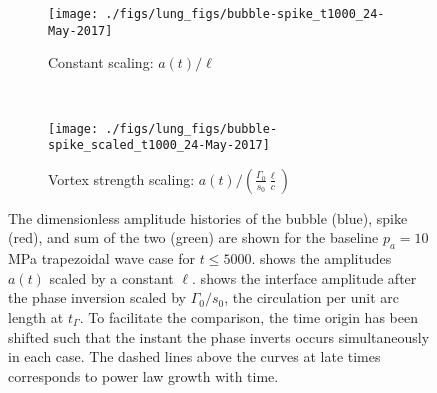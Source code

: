 \documentclass{jfm}%
\begin{document}
\begin{figure}
  \centering
  \begin{subfigure}[t]{0.45\textwidth}
    \centering
    \texttt{[image: ./figs/lung\_figs/bubble-spike\_t1000\_24-May-2017]}
    \caption{\label{fig:trapz_bubble-spike_t1000_unscaled} Constant scaling: $a(t)/\ell$}
  \end{subfigure}
  ~
  \begin{subfigure}[t]{0.45\textwidth}
    \texttt{[image: ./figs/lung\_figs/bubble-spike\_scaled\_t1000\_24-May-2017]}
    \caption{\label{fig:trapz_bubble-spike_t1000_scaled} Vortex strength scaling: $a(t)/\left(\frac{\Gamma_0}{s_0}\frac{\ell}{c}\right)$}
  \end{subfigure}
  \caption{The dimensionless amplitude histories of the bubble (blue),
    spike (red), and sum of the two (green) are shown for the baseline
    $p_a = 10$ MPa trapezoidal wave case for $t \leq
    5000$.  shows the
    amplitudes $a(t)$ scaled by a constant
    $\ell$.  shows the
    interface amplitude after the phase inversion scaled by
    $\Gamma_0/s_0$, the circulation per unit arc length at
    $t_\Gamma$. To facilitate the comparison, the time origin has been
    shifted such that the instant the phase inverts occurs
    simultaneously in each case. The dashed lines above the curves at
    late times corresponds to power law growth with time.}
  \label{fig:trapz_bubble-spike_t1000}
\end{figure}
\end{document}
